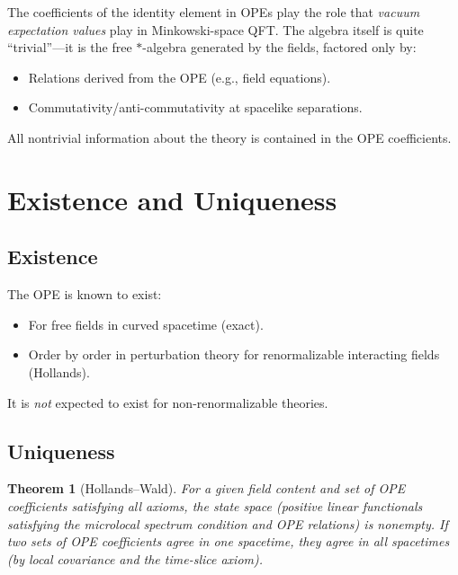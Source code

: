 \documentclass[11pt,a4paper]{article}
\newtheorem{theorem}{Theorem}[section]
\begin{document}
The coefficients of the identity element in OPEs play the role that
\emph{vacuum expectation values} play in Minkowski-space QFT. The algebra
itself is quite ``trivial''---it is the free $*$-algebra generated by the
fields, factored only by:
\begin{itemize}[nosep]
  \item Relations derived from the OPE (e.g., field equations).
  \item Commutativity/anti-commutativity at spacelike separations.
\end{itemize}

All nontrivial information about the theory is contained in the OPE
coefficients.

\section{Existence and Uniqueness}

\subsection{Existence}

The OPE is known to exist:
\begin{itemize}[nosep]
  \item For free fields in curved spacetime (exact).
  \item Order by order in perturbation theory for renormalizable interacting
        fields (Hollands).
\end{itemize}

It is \emph{not} expected to exist for non-renormalizable theories.

\subsection{Uniqueness}

\begin{theorem}[Hollands--Wald]
For a given field content and set of OPE coefficients satisfying all
axioms, the state space (positive linear functionals satisfying the
microlocal spectrum condition and OPE relations) is nonempty. If two
sets of OPE coefficients agree in one spacetime, they agree in all
spacetimes (by local covariance and the time-slice axiom).
\end{theorem}

\end{document}
